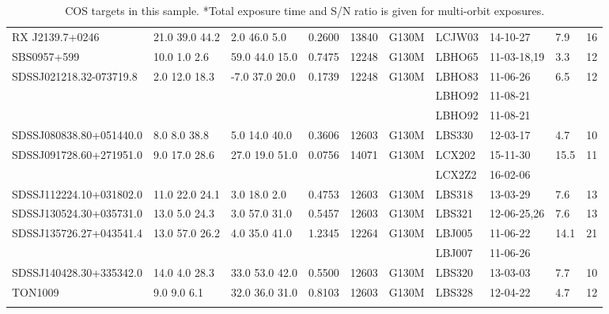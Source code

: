 \documentclass[twocolumn,tighten]{aastex6}
\begin{document}
\begin{table}[ht]
\begin{center}
\begin{tabular}{l l l l l l l l l l}
RX J2139.7+0246  &   21.0  39.0  44.2  &      2.0  46.0  5.0     &   0.2600  & 13840  		    &   G130M  &   LCJW03		& 14-10-27  		   & 	7.9  &      16         \\
SBS0957+599         &       10.0  1.0  2.6  &     59.0  44.0  15.0  &    0.7475  & 12248  		    &   G130M  &   LBHO65		& 11-03-18,19  		   &   3.3  &      12         \\
SDSSJ021218.32-073719.8  & 2.0  12.0  18.3  &    -7.0  37.0  20.0  &    0.1739  & 12248  	    &   G130M  &   LBHO83		& 11-06-26		   &   6.5  &      12         \\
				        	     & 	  	  	  	&    		  	       &    	  	 & 	  	    &                 &   LBHO92		& 11-08-21		   &          &                   \\
				        	     & 	  	  	  	&    		  	       &    	  	 & 	  	    &                 &   LBHO92		& 11-08-21		   &          &                   \\
SDSSJ080838.80+051440.0 &   8.0  8.0  38.8  &     5.0  14.0  40.0  &    0.3606  & 12603	    &   G130M  &   LBS330   		& 12-03-17  		   &   4.7  &      10         \\
SDSSJ091728.60+271951.0 & 9.0  17.0  28.6  &    27.0  19.0  51.0 &    0.0756  & 14071	    &   G130M  &   LCX202			& 15-11-30		   & 15.5  &      11         \\
				        	     & 	  	  	        &    		  	       &    	  	 & 	  	    &                 &   LCX2Z2			& 16-02-06		   &          &                   \\
SDSSJ112224.10+031802.0 & 11.0  22.0  24.1 &     3.0  18.0  2.0    &    0.4753  & 12603      &   G130M  &   LBS318			& 13-03-29		   &   7.6  &      13         \\
SDSSJ130524.30+035731.0 & 13.0  5.0  24.3  &    3.0  57.0  31.0   &    0.5457  & 12603	    &   G130M  &   LBS321			& 12-06-25,26		   &   7.6  &      13         \\
SDSSJ135726.27+043541.4 & 13.0  57.0  26.2 &    4.0  35.0  41.0  &    1.2345  & 12264      &   G130M  &   LBJ005  		& 11-06-22		   & 14.1  &      21         \\
				        	     & 	  	  	        &    		  	       &    	  	 & 	  	    &                &   LBJ007  			& 11-06-26		   &          &                   \\
SDSSJ140428.30+335342.0 & 14.0  4.0  28.3  &   33.0  53.0  42.0  &    0.5500  & 12603  	    &   G130M  &  LBS320   		& 13-03-03   		   &   7.7  &      10          \\
TON1009  			    &    9.0  9.0  6.1   &    32.0  36.0  31.0  &    0.8103  & 12603  	    &   G130M  &  LBS328   		& 12-04-22   		   &   4.7  &      12         \\

 \\
\hline

\end{tabular}
\end{center}
  \caption{\small{COS targets in this sample. *Total exposure time and S/N ratio is given for multi-orbit exposures.}}
  \label{target_table}
\end{table}
\end{document}
